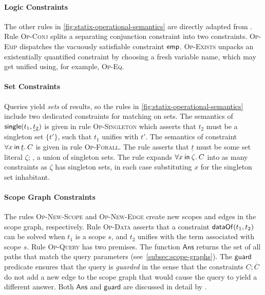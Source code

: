 \paragraph{Logic Constraints}
The other rules in \cref{fig:statix-operational-semantics} are directly adapted from \citet{RouvoetAPKV20}.
Rule \textsc{Op-Conj} splits a separating conjunction constraint into two constraints.
\textsc{Op-Emp} dispatches the vacuously satisfiable constraint $\mathsf{emp}{}$.
\textsc{Op-Exists} unpacks an existentially quantified constraint by choosing a fresh variable name, which may get unified using, for example, \textsc{Op-Eq}.


\paragraph{Set Constraints}
Queries yield \emph{sets} of results, so the rules in \cref{fig:statix-operational-semantics} include two dedicated constraints for matching on sets.
The semantics of $\mathsf{single}(t_1, \underline{t_2})$ is given in rule \textsc{Op-Singleton} which asserts that $t_2$ must be a singleton set $\{ t' \}$, such that $t_1$ unifies with $t'$.
The semantics of constraint $\forall x\: \mathsf{in}\: \underline{t}.\: C$ is given in rule \textsc{Op-Forall}.
The rule asserts that $\underline{t}$ must be some set literal $\zeta$; \ie, a union of singleton sets.
The rule expands $\forall x\: \mathsf{in}\: \zeta.\: C$ into as many constraints as $\zeta$ has singleton sets, in each case substituting $x$ for the singleton set inhabitant.


\paragraph{Scope Graph Constraints}
The rules \textsc{Op-New-Scope} and \textsc{Op-New-Edge} create new scopes and edges in the scope graph, respectively.
Rule \textsc{Op-Data} asserts that a constraint $\mathsf{dataOf}(t_1, t_2)$ can be solved when $t_1$ is a scope $s$, and $t_2$ unifies with the term associated with scope $s$.
Rule \textsc{Op-Query} has two premises.
The function $\mathsf{Ans}$ returns the set of all paths that match the query parameters (see~\cref{subsec:scope-graphs}).
The $\mathsf{guard}$ predicate ensures that the query is \emph{guarded} in the sense that the constraints $C; \overline{C}$ do not add a new edge to the scope graph that would cause the query to yield a different answer.
Both $\mathsf{Ans}$ and $\mathsf{guard}$ are discussed in detail by \citet[\S3.1 and \S{}5.3]{RouvoetAPKV20}.


